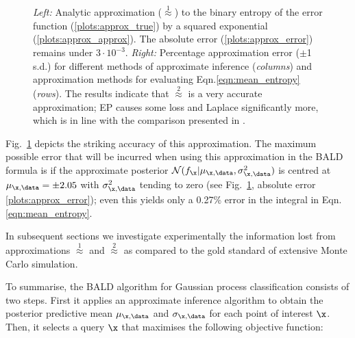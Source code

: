 \begin{figure}
	\centering

	\caption[Taylor series approximation to the value of information in GP classification]{\emph{Left:} Analytic approximation ({\scriptsize $\stackrel{1}{\approx}$}) to the binary entropy of the error function (\ref{plots:approx_true}) by a squared exponential (\ref{plots:approx_approx}). The absolute error (\ref{plots:approx_error}) remains under $3\cdot 10^{-3}$. \emph{Right:} Percentage approximation error ($\pm$1 s.d.) for different methods of approximate inference (\emph{columns}) and approximation methods for evaluating Eqn.\eqref{eqn:mean_entropy} (\emph{rows}). The results indicate that {\scriptsize $\stackrel{2}{\approx}$} is a very accurate approximation; EP causes some loss and Laplace significantly more, which is in line with the comparison presented in \citep{Kuss2005}. }\label{fig:trick}
\end{figure}

Fig.\ \ref{fig:trick} depicts the striking accuracy of this approximation. The maximum possible error that will be incurred when using this approximation in the BALD formula is if the approximate posterior $\mathcal{N}(f_{\x}\vert \mu_{\x,\data},\sigma_{\x,\data}^2)$ is centred at $\mu_{\x,\data}=\pm 2.05$  with $\sigma_{\x,\data}^2$ tending to zero (see Fig.\ \ref{fig:trick}, absolute error \ref{plots:approx_error}); even this yields only a 0.27\% error in the integral in Eqn.\eqref{eqn:mean_entropy}.

In subsequent sections we investigate experimentally the information lost from approximations {\scriptsize $\stackrel{1}{\approx}$} and {\scriptsize $\stackrel{2}{\approx}$} as compared to the gold standard of extensive Monte Carlo simulation.

To summarise, the BALD algorithm for Gaussian process classification consists of two steps. First it applies an approximate inference algorithm to obtain the posterior predictive mean $\mu_{\x,\data}$ and $\sigma_{\x,\data}$ for each point of interest $\x$. Then, it selects a query $\x$ that maximises the following objective function:

